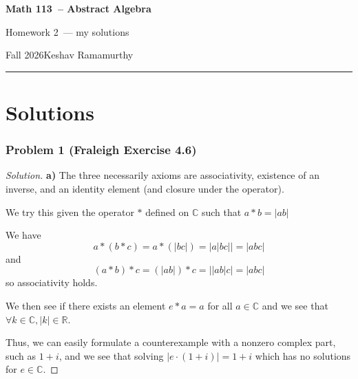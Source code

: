 \documentclass[11pt]{article}
\newcommand{\studentname}{Keshav Ramamurthy}
\newcommand{\coursename}{Math 113}
\newcommand{\courselongname}{Abstract Algebra}
\newcommand{\assignment}{Homework 2}
\newcommand{\term}{Fall 2026}
\newcommand{\1}{\mathbf{1}}
\theoremstyle{definition}
\newenvironment{solution}{\begin{proof}[Solution]}{\end{proof}}
\begin{document}
\begin{center}
  {\Large\sffamily\bfseries \coursename\ -- \courselongname}\par\vspace{3pt}
  {\sffamily \assignment\ — my solutions}\par\vspace{3pt}
  {\small\sffamily \term\quad\textbullet\quad \studentname}
\end{center}
\medskip
\hrule
\bigskip


\clearpage

\section*{Solutions}
\subsubsection*{Problem 1 (Fraleigh Exercise 4.6)}
\begin{solution}
    \textbf{a) }The three necessarily axioms are associativity, existence of an inverse, and an identity
element (and closure under the operator).
\par We try this given the operator $*$ defined on $\mathbb{C}$ such that $a * b =
|ab|$
\par We have $$a * (b * c) = a * (|bc|) = |a|bc||  = |abc|$$
and 
$$(a * b) * c = (|ab|) * c = ||ab|c| = |abc|$$
so associativity holds.
\par We then see if there exists an element $e * a = a$ for all $a \in \mathbb{C}$
and we see that $\forall k \in \mathbb{C}, |k| \in \mathbb{R}.$ 
\par Thus, we can easily formulate a counterexample with a nonzero complex part, such as $1 +
i$, and we see that solving $|e \cdot (1 + i)| = 1 + i$ which has no solutions for $e
\in \mathbb{C}.$
\end{solution}
\end{document}
